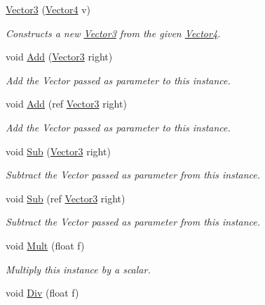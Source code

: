 \begin{DoxyCompactItemize}
\hyperlink{struct_open_t_k_1_1_vector3_a0f946e093f6112e202f887276d9ee119}{Vector3} (\hyperlink{struct_open_t_k_1_1_vector4}{Vector4} v)
\begin{DoxyCompactList}\small\item\em Constructs a new \hyperlink{struct_open_t_k_1_1_vector3}{Vector3} from the given \hyperlink{struct_open_t_k_1_1_vector4}{Vector4}. \end{DoxyCompactList}\item 
void \hyperlink{struct_open_t_k_1_1_vector3_a1a4e92e5eefda241d41355eee295bbca}{Add} (\hyperlink{struct_open_t_k_1_1_vector3}{Vector3} right)
\begin{DoxyCompactList}\small\item\em Add the Vector passed as parameter to this instance.\end{DoxyCompactList}\item 
void \hyperlink{struct_open_t_k_1_1_vector3_ac1e91f76043f9ba4d35cd754dee51321}{Add} (ref \hyperlink{struct_open_t_k_1_1_vector3}{Vector3} right)
\begin{DoxyCompactList}\small\item\em Add the Vector passed as parameter to this instance.\end{DoxyCompactList}\item 
void \hyperlink{struct_open_t_k_1_1_vector3_a954b15a9de80eafd19f3023728a41175}{Sub} (\hyperlink{struct_open_t_k_1_1_vector3}{Vector3} right)
\begin{DoxyCompactList}\small\item\em Subtract the Vector passed as parameter from this instance.\end{DoxyCompactList}\item 
void \hyperlink{struct_open_t_k_1_1_vector3_a5cc7a802e9e8a213e636fcf92005615a}{Sub} (ref \hyperlink{struct_open_t_k_1_1_vector3}{Vector3} right)
\begin{DoxyCompactList}\small\item\em Subtract the Vector passed as parameter from this instance.\end{DoxyCompactList}\item 
void \hyperlink{struct_open_t_k_1_1_vector3_a65502eebc671f091ae751a7776148dbe}{Mult} (float f)
\begin{DoxyCompactList}\small\item\em Multiply this instance by a scalar.\end{DoxyCompactList}\item 
void \hyperlink{struct_open_t_k_1_1_vector3_aac8c8b370d780c3da47dcc68e92517ac}{Div} (float f)

\end{DoxyCompactItemize}
